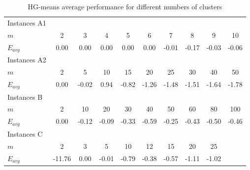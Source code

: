 \begin{table}[H]
\centering
\begin{tabular}{@{}lccccccccc@{}}
\hline
Instances A1 &        &       &       &       &       &       &       &       &       \\
$m$          & 2      & 3     & 4     & 5     & 6     & 7     & 8     & 9     & 10    \\
$E_{avg}$    & 0.00   & 0.00  & 0.00  & 0.00  & 0.00  & -0.01 & -0.17 & -0.03 & -0.06 \\ \hline
Instances A2 &        &       &       &       &       &       &       &       &       \\
$m$          & 2      & 5     & 10    & 15    & 20    & 25    & 30    & 40    & 50    \\
$E_{avg}$    & 0.00   & -0.02 & 0.94  & -0.82 & -1.26 & -1.48 & -1.51 & -1.64 & -1.78 \\ \hline
Instances B  &        &       &       &       &       &       &       &       &       \\
$m$          & 2      & 10    & 20    & 30    & 40    & 50    & 60    & 80    & 100   \\
$E_{avg}$    & 0.00   & -0.12 & -0.09 & -0.33 & -0.59 & -0.25 & -0.43 & -0.50 & -0.46 \\ \hline
Instances C  &        &       &       &       &       &       &       &       &       \\
$m$          & 2      & 3     & 5     & 10    & 12    & 15    & 20    & 25    &       \\
$E_{avg}$    & -11.76 & 0.00  & -0.01 & -0.79 & -0.38 & -0.57 & -1.11 & -1.02 &       \\ \hline
\end{tabular}
\caption{HG-means average performance for different numbers of clusters}
\label{m-analysis}
\end{table}

